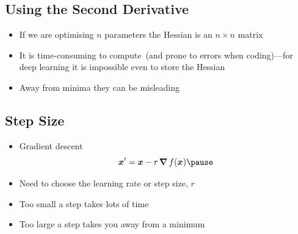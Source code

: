 
\begin{slide}
\section[-1]{Using the Second Derivative}

\pb
\begin{itemize}
\item If we are optimising $n$ parameters the Hessian is an $n\times n$
  matrix\pauseh
\item It is time-consuming to compute\pauseh\ (and prone to errors when
  coding)\pause---for deep learning it is impossible even to store the
  Hessian\pauseb
\item Away from minima they can be misleading
  \begin{center}
    \pause
  \end{center}
\end{itemize}

\end{slide}


\Outline %

\begin{slide}
\section{Step Size}

\begin{PauseHighLight}

\begin{itemize}\squeeze
\item Gradient descent
  \begin{displaymath}
    \bm{x}' = \bm{x} - r \, \grad \,f(\bm{x})\pause
  \end{displaymath}
\item Need to choose the learning rate or step size, $r$\pause
\item Too small a step takes lots of time\pause
\item Too large a step takes you away from a minimum\pause
\end{itemize}

\end{PauseHighLight}
\end{slide}

